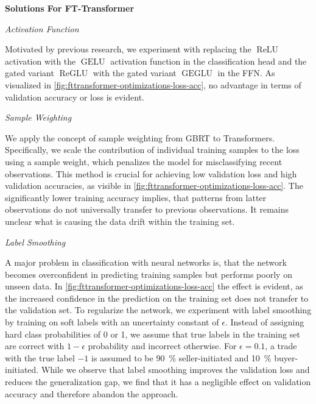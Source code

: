 \textbf{Solutions For FT-Transformer}

\emph{Activation Function}

Motivated by previous research, we experiment with replacing the $\operatorname{ReLU}$ activation with the $\operatorname{GELU}$ activation function \autocite[\checkmark][2]{hendrycksGaussianErrorLinear2020} in the classification head and the gated variant $\operatorname{ReGLU}$ with the gated variant $\operatorname{GEGLU}$ \autocite[\checkmark][2]{shazeerGLUVariantsImprove2020} in the \gls{FFN}. As visualized in \cref{fig:fttransformer-optimizations-loss-acc}, no advantage in terms of validation accuracy or loss is evident.

\emph{Sample Weighting}

We apply the concept of sample weighting from \gls{GBRT} to Transformers. Specifically, we scale the contribution of individual training samples to the loss using a sample weight, which penalizes the model for misclassifying recent observations. This method is crucial for achieving low validation loss and high validation accuracies, as visible in \cref{fig:fttransformer-optimizations-loss-acc}. The significantly lower training accuracy implies, that patterns from latter observations do not universally transfer to previous observations. It remains unclear what is causing the data drift within the training set.

\clearpage

\emph{Label Smoothing}

A major problem in classification with neural networks is, that the network becomes overconfident in predicting training samples but performs poorly on unseen data. In \cref{fig:fttransformer-optimizations-loss-acc} the effect is evident, as the increased confidence in the prediction on the training set does not transfer to the validation set. To regularize the network, we experiment with label smoothing \autocite[\checkmark][2823]{szegedyRethinkingInceptionArchitecture2016} by training on soft labels with an uncertainty constant of $\epsilon$. Instead of assigning hard class probabilities of 0 or 1, we assume that true labels in the training set are correct with $1-\epsilon$ probability and incorrect otherwise. For $\epsilon=\num{0.1}$, a trade with the true label $-1$ is assumed to be \SI{90}{\percent} seller-initiated and \SI{10}{\percent} buyer-initiated. While we observe that label smoothing improves the validation loss and reduces the generalization gap, we find that it has a negligible effect on validation accuracy and therefore abandon the approach.

